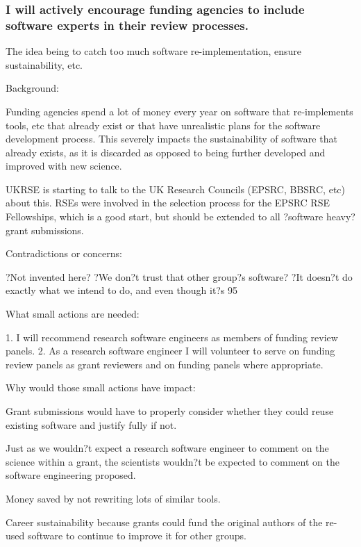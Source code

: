 \documentclass[a4paper,UKenglish]{dagman}
\renewcommand{\paragraph}[1]{\subsubsection*{#1}\xspace}
\begin{document}
\paragraph{I will actively encourage funding agencies to include software experts in their review processes.}

The idea being to catch too much software re-implementation, ensure sustainability, etc.


Background:

Funding agencies spend a lot of money every year on software that re-implements tools, etc that already exist or that have unrealistic plans for the software development process. This severely impacts the sustainability of software that already exists, as it is discarded as opposed to being further developed and improved with new science. 

UKRSE is starting to talk to the UK Research Councils (EPSRC, BBSRC, etc) about this. RSEs were involved in the selection process for the EPSRC RSE Fellowships, which is a good start, but should be extended to all ?software heavy? grant submissions.

Contradictions or concerns:

?Not invented here?
?We don?t trust that other group?s software?
?It doesn?t do exactly what we intend to do, and even though it?s 95%

What small actions are needed:

1.	I will recommend research software engineers as members of funding review panels.
2.	As a research software engineer I will volunteer to serve on funding review panels as grant reviewers and on funding panels where appropriate.

Why would those small actions have impact:

Grant submissions would have to properly consider whether they could reuse existing software and justify fully if not.

Just as we wouldn?t expect a research software engineer to comment on the science within a grant, the scientists wouldn?t be expected to comment on the software engineering proposed.

Money saved by not rewriting lots of similar tools.

Career sustainability because grants could fund the original authors of the re-used software to continue to improve it for other groups.
\end{document}
